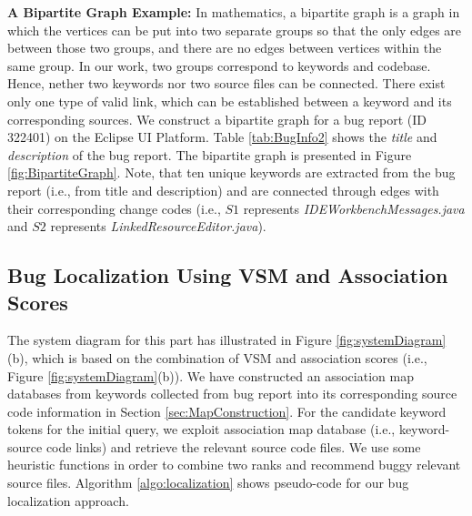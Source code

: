 \documentclass[conference]{IEEEtran}
\begin{document}
\textbf{A Bipartite Graph Example:} In mathematics, a bipartite graph is a graph in which the vertices can be put into two separate groups so that the only edges are between those two groups, and there are no edges between vertices within the same group. 
In our work, two groups correspond to keywords and codebase. Hence, nether two keywords nor two source files can be connected. There exist only one type of valid link, which can be established between a keyword and its corresponding sources. 
We construct a bipartite graph for a bug report (ID 322401) on the Eclipse UI Platform. Table \ref{tab:BugInfo2} shows the \textit{title} and \textit{description} of the bug report. The bipartite graph is presented in Figure \ref{fig:BipartiteGraph}. Note, that ten unique keywords are extracted from the bug report (i.e., from title and description) and are connected through edges with their corresponding change codes (i.e., $S1$ represents 
\textit{IDEWorkbenchMessages.java} and $S2$ represents 
\textit{LinkedResourceEditor.java}). 
\subsection{Bug Localization Using VSM and Association Scores}

The system diagram for this part has illustrated in Figure \ref{fig:systemDiagram}(b), which 
is based on the combination of VSM and association scores (i.e., Figure \ref{fig:systemDiagram}(b)).
We have constructed an association map databases from keywords collected from bug report into its corresponding source code information in Section \ref{sec:MapConstruction}.
For the candidate keyword tokens for the initial query, we exploit association map database (i.e., keyword-source code links) and retrieve the relevant source code files. We use some heuristic functions in order to combine two ranks and recommend buggy relevant source files. Algorithm \ref{algo:localization} shows pseudo-code for our bug localization approach.
\end{document}
